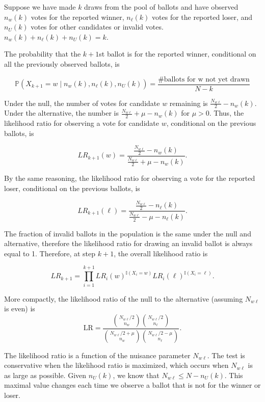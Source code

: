 \documentclass[12pt]{article}
\newcommand{\beq}{\begin{equation}}
\newcommand{\eeq}{\end{equation}}
\begin{document}
Suppose we have made $k$ draws from the pool of ballots and have observed $n_w(k)$ votes for the reported winner, 
$n_\ell(k)$ votes for the reported loser, 
and $n_U(k)$ votes for other candidates or invalid votes.
$n_w(k)+n_\ell(k)+n_U(k) = k$.

The probability that the $k+1$st ballot is for the reported winner, conditional on all the previously observed ballots, is

$$\mathbb{P}(X_{k+1} = w \mid  n_w(k), n_\ell(k), n_U(k)) = \frac{\text{\# ballots for w not yet drawn}}{N - k}$$

Under the null, the number of votes for candidate $w$ remaining is $\frac{N_{w\ell}}{2} - n_w(k)$.  
Under the alternative, the number is $\frac{N_{w\ell}}{2} + \mu - n_w(k)$ for $\mu > 0$.
Thus, the likelihood ratio for observing a vote for candidate $w$, conditional on the previous ballots, is

$$LR_{k+1}(w) = \frac{\frac{N_{w\ell}}{2} - n_w(k)}{\frac{N_{w\ell}}{2}+\mu - n_w(k)}.$$

By the same reasoning, the likelihood ratio for observing a vote for the reported loser, conditional on the previous ballots, is

$$LR_{k+1}(\ell) = \frac{\frac{N_{w\ell}}{2} - n_\ell(k)}{\frac{N_{w\ell}}{2}-\mu - n_\ell(k)}.$$

The fraction of invalid ballots in the population is the same under the null and alternative, therefore the likelihood ratio for drawing an invalid ballot is always equal to 1. Therefore, at step $k+1$, the overall likelihood ratio is

$$LR_{k+1} = \prod_{i=1}^{k+1} LR_i(w)^{\mathbb{I}(X_i= w)}LR_i(\ell)^{\mathbb{I}(X_i = \ell)}.$$

More compactly, the likelihood ratio of the null to the alternative (assuming $N_{w\ell}$ is even) is
\beq
   \mbox{LR} = \frac{ {N_{w\ell}/2 \choose n_w}{N_{w\ell}/2 \choose n_\ell}}
           {{N_{w\ell}/2+\mu \choose n_w}{N_{w\ell}/2-\mu \choose n_\ell}}.
\eeq

The likelihood ratio is a function of the nuisance parameter $N_{w\ell}$.
The test is conservative when the likelihood ratio is maximized, which occurs when $N_{w\ell}$ is as large as possible. 
Given $n_U(k)$, we know that $N_{w\ell} \leq N - n_U(k)$.
This maximal value changes each time we observe a ballot that is not for the winner or loser.






\end{document}
